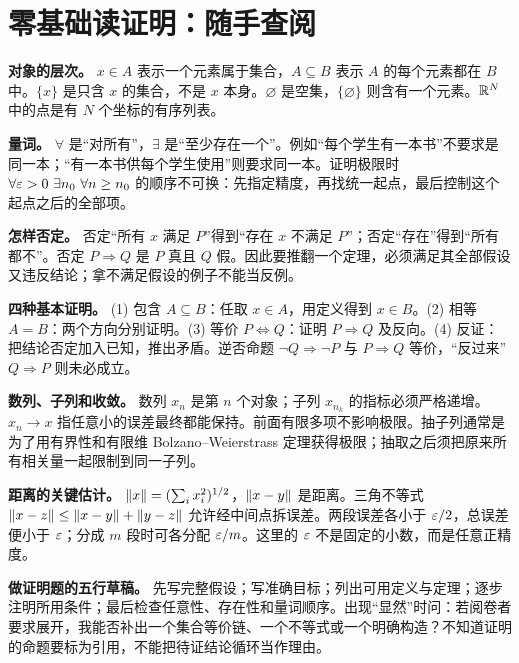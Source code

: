 \section*{零基础读证明：随手查阅}
\textbf{对象的层次。} $x\in A$ 表示一个元素属于集合，$A\subseteq B$ 表示 $A$ 的每个元素都在 $B$ 中。$\{x\}$ 是只含 $x$ 的集合，不是 $x$ 本身。$\varnothing$ 是空集，$\{\varnothing\}$ 则含有一个元素。$\mathbb{R}^N$ 中的点是有 $N$ 个坐标的有序列表。

\textbf{量词。} $\forall$ 是“对所有”，$\exists$ 是“至少存在一个”。例如“每个学生有一本书”不要求是同一本；“有一本书供每个学生使用”则要求同一本。证明极限时 $\forall\varepsilon>0\ \exists n_0\ \forall n\ge n_0$ 的顺序不可换：先指定精度，再找统一起点，最后控制这个起点之后的全部项。

\textbf{怎样否定。} 否定“所有 $x$ 满足 $P$”得到“存在 $x$ 不满足 $P$”；否定“存在”得到“所有都不”。否定 $P\Rightarrow Q$ 是 $P$ 真且 $Q$ 假。因此要推翻一个定理，必须满足其全部假设又违反结论；拿不满足假设的例子不能当反例。

\textbf{四种基本证明。} (1) 包含 $A\subseteq B$：任取 $x\in A$，用定义得到 $x\in B$。(2) 相等 $A=B$：两个方向分别证明。(3) 等价 $P\iff Q$：证明 $P\Rightarrow Q$ 及反向。(4) 反证：把结论否定加入已知，推出矛盾。逆否命题 $\neg Q\Rightarrow\neg P$ 与 $P\Rightarrow Q$ 等价，“反过来” $Q\Rightarrow P$ 则未必成立。

\textbf{数列、子列和收敛。} 数列 $x_n$ 是第 $n$ 个对象；子列 $x_{n_k}$ 的指标必须严格递增。$x_n\to x$ 指任意小的误差最终都能保持。前面有限多项不影响极限。抽子列通常是为了用有界性和有限维 Bolzano--Weierstrass 定理获得极限；抽取之后须把原来所有相关量一起限制到同一子列。

\textbf{距离的关键估计。} $\left\lVert x\right\rVert=(\sum_i x_i^2)^{1/2}$，$\left\lVert x-y\right\rVert$ 是距离。三角不等式 $\left\lVert x-z\right\rVert\le\left\lVert x-y\right\rVert+\left\lVert y-z\right\rVert$ 允许经中间点拆误差。两段误差各小于 $\varepsilon/2$，总误差便小于 $\varepsilon$；分成 $m$ 段时可各分配 $\varepsilon/m$。这里的 $\varepsilon$ 不是固定的小数，而是任意正精度。

\textbf{做证明题的五行草稿。} 先写完整假设；写准确目标；列出可用定义与定理；逐步注明所用条件；最后检查任意性、存在性和量词顺序。出现“显然”时问：若阅卷者要求展开，我能否补出一个集合等价链、一个不等式或一个明确构造？不知道证明的命题要标为引用，不能把待证结论循环当作理由。
\clearpage
